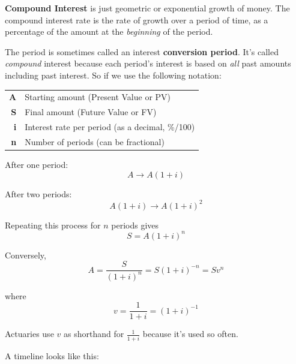 \documentclass[14pt,twoside]{extarticle}
\begin{document}

\textbf{Compound Interest} is just geometric or exponential growth
of money.  The compound interest rate is the rate of growth over a period
of time, as a percentage of the amount at the \emph{beginning} of the period.

The period is sometimes called an interest \textbf{conversion period}. It's called \emph{compound}
interest because each period's interest is based on \emph{all} past amounts including past interest.  So
if we use the following notation:
\begin{center}
  \renewcommand{\arraystretch}{1.2}
  \begin{tabular}{rl}
    \textbf{A} & Starting amount (Present Value or PV)           \\
    \textbf{S} & Final amount (Future Value or FV)               \\
    \textbf{i} & Interest rate per period (as a decimal, \%/100) \\
    \textbf{n} & Number of periods (can be fractional)
  \end{tabular}
\end{center}

After one period:
\[
  A \rightarrow A(1+i)
\]

After two periods:
\[
  A(1+i) \rightarrow A(1+i)^2
\]

\vspace{0.5em}
Repeating this process for $n$ periods gives
\[
  S = A(1+i)^n
\]

Conversely,
\[
  A = \frac{S}{(1+i)^n}
  = S(1+i)^{-n}
  = Sv^n
\]

where
\[
  v = \frac{1}{1+i} = (1+i)^{-1}
\]

\vspace{1em}
Actuaries use $v$ as shorthand for $\frac{1}{1+i}$ because it's used so often.

\newpage
A timeline looks like this:
\end{document}
